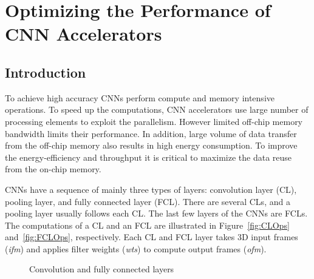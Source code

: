 \documentclass[a4paper,10pt]{article}
\begin{document}

\section{Optimizing the Performance of CNN Accelerators}
\subsection{Introduction}
To achieve high accuracy CNNs perform compute and memory intensive operations. To speed up the computations, CNN accelerators use large number of processing elements to exploit the parallelism. However limited off-chip memory bandwidth limits their performance. In addition, large volume of data transfer from the off-chip memory also results in high energy consumption. To improve the energy-efficiency and throughput it is critical to maximize the data reuse from the on-chip memory.  

CNNs have a sequence of mainly three types of layers: convolution layer (CL), pooling layer, and fully connected layer (FCL). There are several CLs, and a pooling layer usually follows each CL. The last few layers of the CNNs are FCLs. The computations of a CL and an FCL are illustrated in Figure~\ref{fig:CLOps} and~\ref{fig:FCLOps}, respectively. Each CL and FCL layer takes 3D input frames (\textit{ifm}) and applies filter weights (\textit{wts}) to compute output frames (\textit{ofm}).
\begin{figure}[!htb]
	\centering
	\hfil	
	\hfil	
	\caption{Convolution and fully connected layers}
	\label{fig:CNNAcceleratorAndCLOps}
	\vspace{-1.0em}	
\end{figure}
\end{document}
